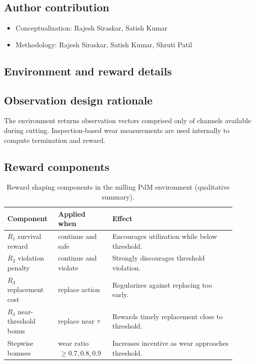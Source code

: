 \documentclass[sn-basic]{sn-jnl} %
\begin{document}
\subsection*{Author contribution}
\begin{itemize}
		\item Conceptualization: Rajesh Siraskar, Satish Kumar
		\item Methodology: Rajesh Siraskar, Satish Kumar, Shruti Patil
\end{itemize}

\begin{appendices}

\section{Environment and reward details}
\label{app:env_reward}
\subsection{Observation design rationale}
The environment returns observation vectors comprised only of channels available during cutting. Inspection-based wear measurements are used internally to compute termination and reward.

\subsection{Reward components}
\begin{table}[t]
		\centering
		\caption{Reward shaping components in the milling PdM environment (qualitative summary).}
		\label{tab:reward_components}
		\begin{tabular}{p{0.20\linewidth} p{0.22\linewidth} p{0.50\linewidth}}
				\toprule
				\textbf{Component} & \textbf{Applied when} & \textbf{Effect}\\
				\midrule
				$R_1$ survival reward & continue and safe & Encourages utilization while below threshold.\\
				$R_2$ violation penalty & continue and violate & Strongly discourages threshold violation.\\
				$R_3$ replacement cost & replace action & Regularizes against replacing too early.\\
				$R_4$ near-threshold bonus & replace near $\tau$ & Rewards timely replacement close to threshold.\\
				Stepwise bonuses & wear ratio $\,\ge 0.7, 0.8, 0.9$ & Increases incentive as wear approaches threshold.\\
				\bottomrule
		\end{tabular}
\end{table}


\end{appendices}
\end{document}
